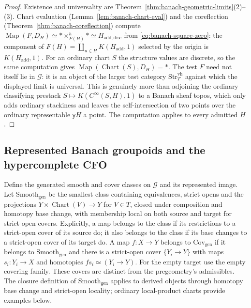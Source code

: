 \documentclass[12pt]{amsart}
\theoremstyle{definition}
\theoremstyle{remark}
\numberwithin{equation}{section}
\newcommand{\y}{\mathsf y}
\DeclareMathOperator{\Map}{Map}
\begin{document}
\begin{proof}
Existence and universality are
Theorem~\ref{thm:banach-geometric-limits}(2)--(3). Chart evaluation
(Lemma~\ref{lem:banach-chart-eval}) and the coreflection
(Theorem~\ref{thm:banach-coreflection}) compute
$\Map(F,D_H)\simeq *\times^h_{F(H)}*\simeq H_{\mathrm{add,disc}}$
from \eqref{eq:banach-square-zero}: the component of
$F(H)=\coprod_{u\in H}K(H_{\mathrm{add}},1)$ selected by the origin
is $K(H_{\mathrm{add}},1)$. For an ordinary chart $S$ the structure
values are discrete, so the same computation gives
$\Map(\operatorname{Chart}(S),D_H)=*$. The test $F$ need not itself
lie in $\mathcal G$: it is an object of the larger test category
$\mathrm{Str}_T^{\mathrm{vh}}$ against which the displayed limit is
universal. This is genuinely more than adjoining the ordinary
classifying prestack $S\mapsto K(C^{\infty}(S,H),1)$ to a Banach
sheaf topos, which only adds ordinary stackiness and leaves the
self-intersection of two points over the ordinary representable $\y H$ a
point. The computation applies to every admitted $H$.
\end{proof}

\subsection{Represented Banach groupoids and the hypercomplete CFO}
\label{subsec:banach-cfo}

Define the generated smooth and cover classes on $\mathcal G$
and its represented image. Let $\mathrm{Smooth}_{\mathrm{gen}}$
be the smallest class containing equivalences, strict opens and
the projections $Y\times\operatorname{Chart}(V)\to Y$ for
$V\in T$, closed under composition and homotopy base change,
with membership local on both source and target for strict-open
covers. Explicitly, a map belongs to the class if its restrictions
to a strict-open cover of its source do; it also belongs to the
class if its base changes to a strict-open cover of its target do.
A map $f:X\to Y$ belongs to $\mathrm{Cov}_{\mathrm{gen}}$ if it
belongs to $\mathrm{Smooth}_{\mathrm{gen}}$ and there is a
strict-open cover $\{Y_i\to Y\}$ with maps $s_i:Y_i\to X$ and
homotopies $f s_i\simeq(Y_i\to Y)$. For the empty target use
the empty covering family. These covers are distinct from the
pregeometry's admissibles. The closure definition of
$\mathrm{Smooth}_{\mathrm{gen}}$ applies to derived objects through
homotopy base change and strict-open locality; ordinary
local-product charts provide examples below.
\end{document}
